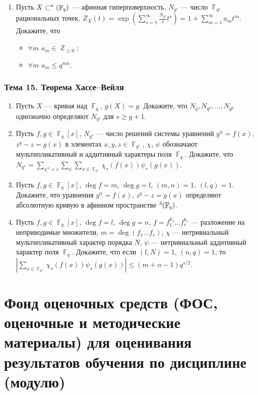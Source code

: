 \documentclass[a4paper, 12pt]{article}
\DeclareMathOperator{\ZZ}{\mathbb{Z}}
\let\AA\relax
\DeclareMathOperator{\AA}{\mathbb{A}}
\DeclareMathOperator{\FF}{\mathbb{F}}
\begin{document}
\begin{enumerate}[noitemsep,topsep=0pt]
    \item Пусть $X\subset \AA^n(\FF_q)$ --- афинная гиперповерхность, $N_{q^s}$ --- число $\FF_{q^s}$ рациональных точек, $Z_X(t)=\exp\left(\sum_{s=1}^\infty \frac{N_{q^s}}{s} t^s\right) = 1+\sum_{m=1}^\infty a_m t^m$. Докажите, что 
    \begin{itemize}[noitemsep,topsep=0pt]
        \item $\forall m$ $a_m\in\ZZ_{\geqslant 0}$;
        \item $\forall m$ $a_m\leqslant q^{mn}$.
    \end{itemize} %
\end{enumerate}

\subsubsection{Тема 15. Теорема Хассе--Вейля}

\begin{enumerate}[noitemsep,topsep=0pt]
    \item Пусть $X$ --- кривая над $\FF_q$, $g(X)=g$. Докажите, что $N_{q},N_{q^2},\dots, N_{q^g}$ однозначно определяют $N_{q^s}$ для $s\geqslant g+1$. %
    \item Пусть $f,g\in\FF_q[x]$, $N_{q^s}$ --- число решений системы уравнений $y^n=f(x)$, $z^q-z=g(x)$ в элементах $x,y,z\in\FF_{q^s}$, $\chi$, $\psi$ обозначают мультипликативный и аддитивный характеры поля $\FF_q$. Докажите, что $N_{q^s}=\sum_{\chi^n=\epsilon}\sum_{\psi}\sum_{x\in\FF_{q^s}} \chi_s(f(x))\psi_s(g(x))$. %
    \item Пусть $f,g\in\FF_q[x]$, $\deg f = m$, $\deg g = l$, $(m,n)=1$, $(l,q)=1$. Докажите, что уравнения $y^n=f(x)$, $z^q-z=g(x)$ определяют абсолютную кривую в афинном пространстве $\AA^3(\overline{\FF}_q)$. %
    \item Пусть $f,g\in\FF_q[x]$, $\deg f = l$, $\deg g = n$, $f=f_1^{k_1}\dots f_r^{k_r}$ --- разложение на неприводимые множители, $m=\deg(f_1\dots f_r)$, $\chi$ --- нетривиальный мультипликативный характер порядка $N$, $\psi$ --- нетривиальный аддитивный характер  поля $\FF_q$. Докажите, что если $(l,N)=1$, $(n,q)=1$, то $\left|\sum_{x\in\FF_{q^s}} \chi_s(f(x)) \psi_s(g(x))\right| \leqslant (m+n-1) q^{s/2}$. %
\end{enumerate}

\section{Фонд оценочных средств (ФОС, оценочные и методические материалы) для оценивания результатов обучения по дисциплине (модулю)}
\end{document}
